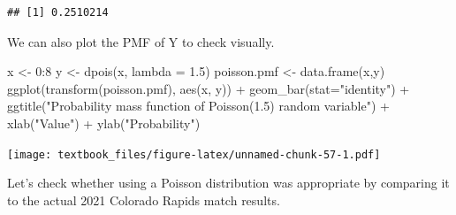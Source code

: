 \documentclass[
  11pt,
]{book}
\newenvironment{Shaded}{\begin{snugshade}}{\end{snugshade}}
\newcommand{\AttributeTok}[1]{\textcolor[rgb]{0.77,0.63,0.00}{#1}}
\newcommand{\DecValTok}[1]{\textcolor[rgb]{0.00,0.00,0.81}{#1}}
\newcommand{\FloatTok}[1]{\textcolor[rgb]{0.00,0.00,0.81}{#1}}
\newcommand{\FunctionTok}[1]{\textcolor[rgb]{0.00,0.00,0.00}{#1}}
\newcommand{\NormalTok}[1]{#1}
\newcommand{\OtherTok}[1]{\textcolor[rgb]{0.56,0.35,0.01}{#1}}
\newcommand{\SpecialCharTok}[1]{\textcolor[rgb]{0.00,0.00,0.00}{#1}}
\newcommand{\StringTok}[1]{\textcolor[rgb]{0.31,0.60,0.02}{#1}}
\theoremstyle{definition}
\theoremstyle{definition}
\theoremstyle{definition}
\theoremstyle{definition}
\theoremstyle{remark}
\begin{document}
\begin{verbatim}
## [1] 0.2510214
\end{verbatim}

\newpage

We can also plot the PMF of Y to check visually.

\begin{Shaded}
\begin{Highlighting}[]
\NormalTok{x }\OtherTok{\textless{}{-}} \DecValTok{0}\SpecialCharTok{:}\DecValTok{8}
\NormalTok{y }\OtherTok{\textless{}{-}} \FunctionTok{dpois}\NormalTok{(x, }\AttributeTok{lambda =} \FloatTok{1.5}\NormalTok{)}
\NormalTok{poisson.pmf }\OtherTok{\textless{}{-}} \FunctionTok{data.frame}\NormalTok{(x,y)}
\FunctionTok{ggplot}\NormalTok{(}\FunctionTok{transform}\NormalTok{(poisson.pmf), }\FunctionTok{aes}\NormalTok{(x, y)) }\SpecialCharTok{+} 
  \FunctionTok{geom\_bar}\NormalTok{(}\AttributeTok{stat=}\StringTok{"identity"}\NormalTok{) }\SpecialCharTok{+} 
  \FunctionTok{ggtitle}\NormalTok{(}\StringTok{"Probability mass function of Poisson(1.5) random variable"}\NormalTok{) }\SpecialCharTok{+}
  \FunctionTok{xlab}\NormalTok{(}\StringTok{"Value"}\NormalTok{) }\SpecialCharTok{+}
  \FunctionTok{ylab}\NormalTok{(}\StringTok{"Probability"}\NormalTok{)}
\end{Highlighting}
\end{Shaded}

\texttt{[image: textbook\_files/figure-latex/unnamed-chunk-57-1.pdf]}

\newpage

Let's check whether using a Poisson distribution was appropriate by comparing it to the actual 2021 Colorado Rapids match results.
\end{document}
